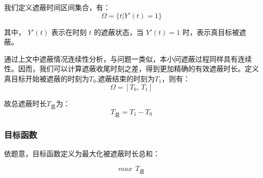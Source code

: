 \documentclass[withoutpreface,bwprint]{cumcmthesis}
\numberwithin{equation}{section} %
\numberwithin{figure}{section} %
\numberwithin{table}{section}  %
\begin{document}

我们定义遮蔽时间区间集合，有：
\begin{equation}
\Omega = \{t|Y'(t)=1\}
\end{equation}

其中， $Y'(t)$ 表示在时刻 $t$ 的遮蔽状态，当 $Y'(t) = 1$ 时，表示真目标被遮蔽。

通过上文中遮蔽情况连续性分析，与问题一类似，本小问遮蔽过程同样具有连续性。因而，我们可以计算遮蔽收尾时刻之差，得到更加精确的有效遮蔽时长。定义真目标开始被遮蔽的时刻为$T_0$,遮蔽结束的时刻为$T_1$，则有：
\begin{equation}
\Omega = [T_0,\,T_1]
\end{equation}

故总遮蔽时长$T_\text{总}$为：
\begin{equation}
    T_\text{总}=T_1-T_0
\end{equation}

\subsubsection{目标函数}

依题意，目标函数定义为最大化被遮蔽时长总和：

\begin{equation}
    \textit{max}\ \ T_{\text{总}} 
\end{equation}
\end{document}
